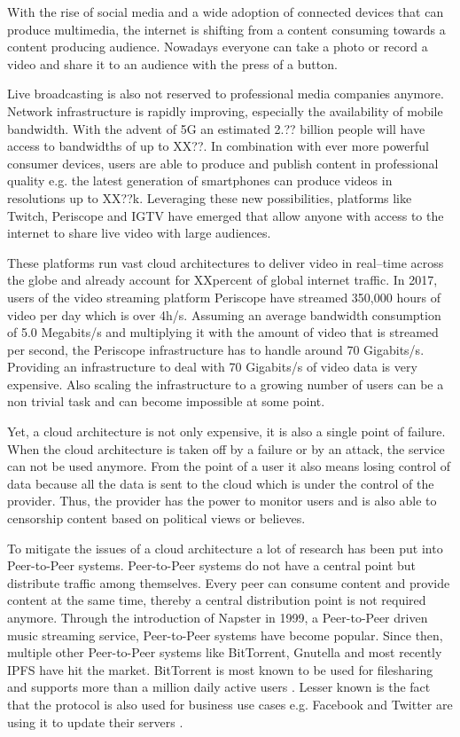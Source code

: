 With the rise of social media and a wide adoption of connected devices that can produce multimedia, the internet is shifting from a content consuming towards a content producing audience. Nowadays everyone can take a photo or record a video and share it to an audience with the press of a button. 

Live broadcasting is also not reserved to professional media companies anymore. Network infrastructure is rapidly improving, especially the availability of mobile bandwidth. With the advent of 5G an estimated 2.?? billion people will have access to bandwidths of up to XX??. In combination with ever more powerful consumer devices, users are able to produce and publish content in professional quality e.g. the latest generation of smartphones can produce videos in resolutions up to XX??k.
Leveraging these new possibilities, platforms like Twitch, Periscope and IGTV have emerged that allow anyone with access to the internet to share live video with large audiences.

These platforms run vast cloud architectures to deliver video in real–time across the globe and already account for XXpercent of global internet traffic.
In 2017, users of the video streaming platform Periscope have streamed 350,000 hours of video per day \cite{periscope-stats} which is over 4h/s. 
Assuming an average bandwidth consumption of 5.0 Megabits/s and multiplying it with the amount of video that is streamed per second, the Periscope infrastructure has to handle around 70 Gigabits/s.
Providing an infrastructure to deal with 70 Gigabits/s of video data is very expensive. Also scaling the infrastructure to a growing number of users can be a non trivial task and can become impossible at some point.

Yet, a cloud architecture is not only expensive, it is also a single point of failure. When the cloud architecture is taken off by a failure or by an attack, the service can not be used anymore.
From the point of a user it also means losing control of data because all the data is sent to the cloud which is under the control of the provider. Thus, the provider has the power to monitor users and is also able to censorship content based on political views or believes.

To mitigate the issues of a cloud architecture a lot of research has been put into Peer-to-Peer systems. Peer-to-Peer systems do not have a central point but distribute traffic among themselves. Every peer can consume content and provide content at the same time, thereby a central distribution point is not required anymore. Through the introduction of Napster in 1999, a Peer-to-Peer driven music streaming service, Peer-to-Peer systems have become popular. Since then, multiple other Peer-to-Peer systems like BitTorrent, Gnutella and most recently IPFS have hit the market. BitTorrent is most known to be used for filesharing and supports more than a million daily active users \cite{bittorrent-stats}. Lesser known is the fact that the protocol is also used for business use cases e.g. Facebook and Twitter are using it to update their servers \cite{bittorrent-facebook}.


